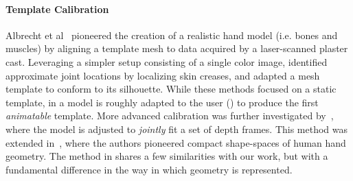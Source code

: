 \paragraph{Template Calibration}
Albrecht et al~ pioneered the creation of a realistic hand model (i.e. bones and muscles) by aligning a template mesh to data acquired by a laser-scanned plaster cast. Leveraging a simpler setup consisting of a single color image, \cite{rhee2006hand} identified approximate joint locations by localizing skin creases, and adapted a mesh template to conform to its silhouette. While these methods focused on a static template, in \cite{delagorce2011model} a model is roughly adapted to the user () to produce the first \emph{animatable} template. More advanced calibration was further investigated by~\cite{taylor2014user}, where the model is adjusted to \emph{jointly} fit a set of depth frames. This method was extended in~\cite{khamis15learning}, where the authors pioneered compact   shape-spaces of human hand geometry.
% 
The method in \cite{taylor2014user} shares a few similarities with our work, but with a fundamental difference in the way in which geometry is represented. 


